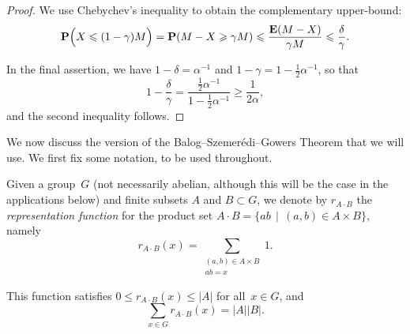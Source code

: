 \documentclass[12pt]{amsart}
\renewcommand{\leq}{\leqslant}
\renewcommand{\geq}{\geqslant}
\numberwithin{equation}{section}
\newcommand{\proba}{\mathbf{P}}
\newcommand{\expect}{\mathbf{E}}
\newcommand{\demi}{{\textstyle{\frac{1}{2}}}}
\theoremstyle{plain}
\theoremstyle{remark}
\theoremstyle{definition}
\renewcommand{\geq}{\geqslant}
\renewcommand{\leq}{\leqslant}
\newcommand{\ab}{\mathrm{ab}}
\begin{document}
\begin{proof}
  We use Chebychev's inequality to obtain the complementary upper-bound:
  \begin{align*}
    \proba\Bigl(X\leq (1-\gamma) M\Bigr)=\proba(M-X\geq \gamma M)
    \leq \frac{\expect(M-X)}{\gamma M}\leq \frac{\delta}{\gamma}.
  \end{align*}

  In the final assertion, we have $1-\delta=\alpha^{-1}$ and
  $1-\gamma=1-\demi\alpha^{-1}$, so that
  $$
  1-\frac{\delta}{\gamma}=\frac{\demi\alpha^{-1}}{1-\demi\alpha^{-1}}\geq
  \frac{1}{2\alpha},
  $$
  and the second inequality follows.
\end{proof}





We now discuss the version of the Balog--Szemerédi--Gowers Theorem that
we will use. We first fix some notation, to be used throughout.

Given a group~$G$ (not necessarily abelian, although this will be the
case in the applications below) and finite subsets $A$ and $B\subset G$,
we denote by $r_{A\cdot B}$ the \emph{representation function} for the
product set $A\cdot B=\{ab\,\mid\, (a,b)\in A\times B\}$, namely
$$
r_{A\cdot B}(x)=\sum_{\substack{(a,b)\in A\times B\\ab=x}}1.
$$

This function satisfies $0\leq r_{A\cdot B}(x)\leq |A|$ for all~$x\in
G$, and
$$
\sum_{x\in G}r_{A\cdot B}(x)=|A||B|.
$$
\end{document}
